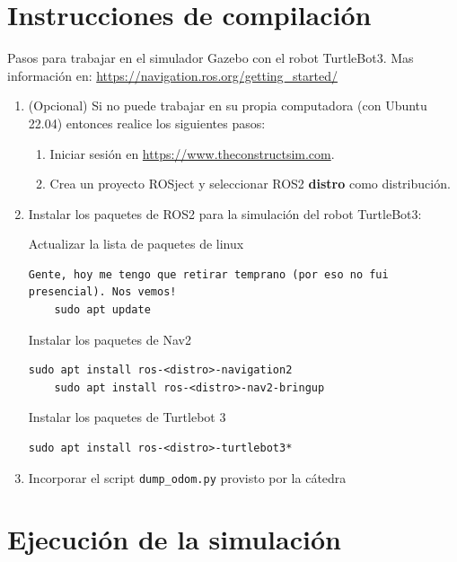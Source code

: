 \documentclass[tp]{lcc}
\begin{document}
\section{Instrucciones de compilación}
Pasos para trabajar en el simulador Gazebo con el robot TurtleBot3. Mas información en: \url{https://navigation.ros.org/getting_started/}

\begin{enumerate}

\item (Opcional) Si no puede trabajar en su propia computadora (con Ubuntu 22.04) entonces realice los siguientes pasos:

\begin{enumerate}
	\item Iniciar sesión en \url{https://www.theconstructsim.com}.
	\item Crea un proyecto ROSject y seleccionar ROS2 {\bf \<distro\>} como distribución.
\end{enumerate}


\item Instalar los paquetes de ROS2 para la simulación del robot TurtleBot3:

Actualizar la lista de paquetes de linux
\begin{lstlisting}[style=bash] Gente, hoy me tengo que retirar temprano (por eso no fui presencial). Nos vemos!
    sudo apt update
\end{lstlisting}

Instalar los paquetes de Nav2 
\begin{lstlisting}[style=bash] 
	sudo apt install ros-<distro>-navigation2
	sudo apt install ros-<distro>-nav2-bringup
\end{lstlisting}

Instalar los paquetes de Turtlebot 3
\begin{lstlisting}[style=bash] 
	sudo apt install ros-<distro>-turtlebot3*
\end{lstlisting}

	\item Incorporar el script \lstinline[style=bash]{dump_odom.py} provisto por la cátedra
	
\end{enumerate}

\section{Ejecución de la simulación}
\end{document}
